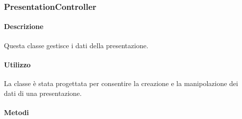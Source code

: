 \newpage
\subsubsection{PresentationController}
	
	\paragraph{Descrizione}
		Questa classe gestisce i dati della presentazione.
	\paragraph{Utilizzo}
		La classe è stata progettata per consentire la creazione e la manipolazione dei dati di una presentazione.
	
	\paragraph{Metodi}
